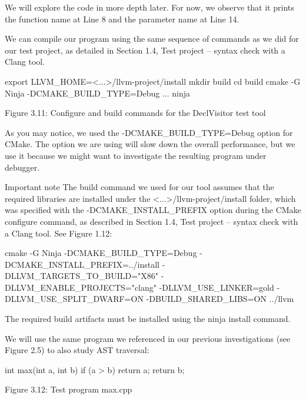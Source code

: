We will explore the code in more depth later. For now, we observe that it prints the function name at Line 8 and the parameter name at Line 14.

We can compile our program using the same sequence of commands as we did for our test project, as detailed in Section 1.4, Test project – syntax check with a Clang tool.

\begin{shell}
export LLVM_HOME=<...>/llvm-project/install
mkdir build
cd build
cmake -G Ninja -DCMAKE_BUILD_TYPE=Debug ...
ninja
\end{shell}

\begin{center}
Figure 3.11: Configure and build commands for the DeclVisitor test tool
\end{center}

As you may notice, we used the -DCMAKE\_BUILD\_TYPE=Debug option for CMake. The option we are using will slow down the overall performance, but we use it because we might want to investigate the resulting program under debugger.

\begin{myNotic}{Important note}
The build command we used for our tool assumes that the required libraries are installed under the <...>/llvm-project/install folder, which was specified with the -DCMAKE\_INSTALL\_PREFIX option during the CMake configure command, as described in Section 1.4, Test project – syntax check with a Clang tool. See Figure 1.12:

\begin{shell}
cmake -G Ninja -DCMAKE_BUILD_TYPE=Debug -DCMAKE_INSTALL_PREFIX=../install -DLLVM_TARGETS_TO_BUILD="X86" -DLLVM_ENABLE_PROJECTS="clang" -DLLVM_USE_LINKER=gold -DLLVM_USE_SPLIT_DWARF=ON -DBUILD_SHARED_LIBS=ON ../llvm
\end{shell}

The required build artifacts must be installed using the ninja install command.
\end{myNotic}

We will use the same program we referenced in our previous investigations (see Figure 2.5) to also study AST traversal:

\begin{cpp}
int max(int a, int b) {
  if (a > b)
    return a;
  return b;
}
\end{cpp}

\begin{center}
Figure 3.12: Test program max.cpp
\end{center}

